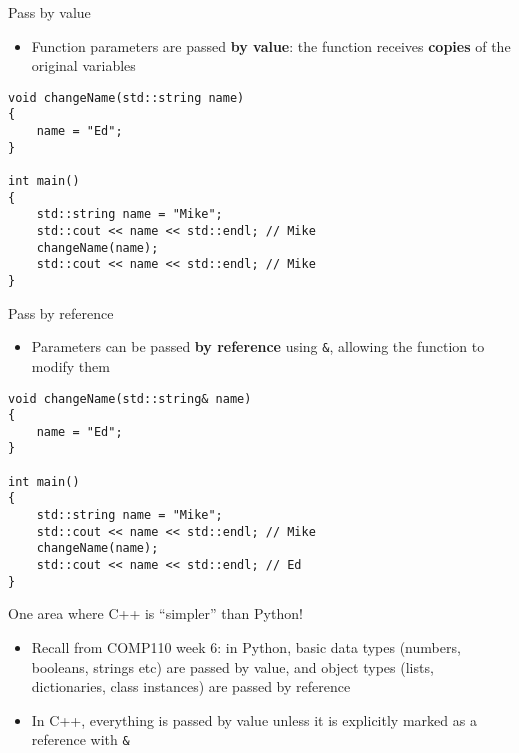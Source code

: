 \begin{frame}[fragile]{Pass by value}
    \begin{itemize}
        \item Function parameters are passed \textbf{by value}:
        the function receives \textbf{copies} of the original variables
    \end{itemize}
    \pause
    \begin{lstlisting}
void changeName(std::string name)
{
    name = "Ed";
}

int main()
{
    std::string name = "Mike";
    std::cout << name << std::endl; // Mike
    changeName(name);
    std::cout << name << std::endl; // Mike
}
    \end{lstlisting}
\end{frame}

\begin{frame}[fragile]{Pass by reference}
    \begin{itemize}
        \item Parameters can be passed \textbf{by reference} using \lstinline{&}, allowing the function to modify them
    \end{itemize}
    \pause
    \begin{lstlisting}
void changeName(std::string& name)
{
    name = "Ed";
}

int main()
{
    std::string name = "Mike";
    std::cout << name << std::endl; // Mike
    changeName(name);
    std::cout << name << std::endl; // Ed
}
    \end{lstlisting}
\end{frame}

\begin{frame}[fragile]{One area where C++ is ``simpler'' than Python!}
    \begin{itemize}
        \item Recall from COMP110 week 6: in Python, basic data types (numbers, booleans, strings etc)
            are passed by value, and object types (lists, dictionaries, class instances) are passed by reference
        \pause
        \item In C++, everything is passed by value unless it is explicitly marked as a reference with \lstinline{&}
    \end{itemize}
\end{frame}

